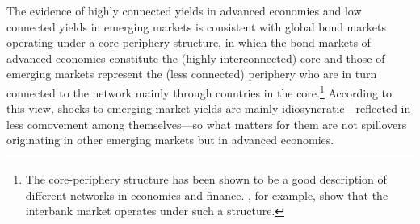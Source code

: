 \begin{appendices}
The evidence of highly connected yields in advanced economies and low connected yields in emerging markets %
is consistent with %
global bond markets operating under a core-periphery structure, in which the bond markets of advanced economies constitute the (highly interconnected) core and those of emerging markets represent the (less connected) periphery who are in turn connected to the network mainly through countries in the core.\footnote{ The core-periphery structure has been shown to be a good description of different networks in economics and finance. \cite{CvP:2014}, for example, show that the interbank market operates under such a structure.}
According to this view, shocks to emerging market yields are mainly idiosyncratic---reflected in less comovement among themselves---so
what matters for them %
are not spillovers originating in other emerging markets but in advanced economies.


\end{appendices}
